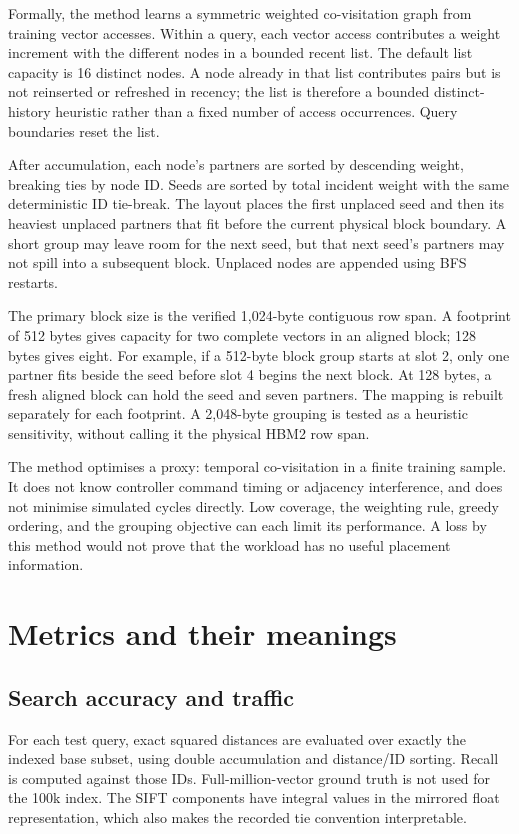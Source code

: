\documentclass[11pt,a4paper]{report}
\begin{document}
Formally, the method learns a symmetric weighted co-visitation graph from training vector accesses. Within a query, each vector access contributes a weight increment with the different nodes in a bounded recent list. The default list capacity is 16 distinct nodes. A node already in that list contributes pairs but is not reinserted or refreshed in recency; the list is therefore a bounded distinct-history heuristic rather than a fixed number of access occurrences. Query boundaries reset the list.

After accumulation, each node's partners are sorted by descending weight, breaking ties by node ID. Seeds are sorted by total incident weight with the same deterministic ID tie-break. The layout places the first unplaced seed and then its heaviest unplaced partners that fit before the current physical block boundary. A short group may leave room for the next seed, but that next seed's partners may not spill into a subsequent block. Unplaced nodes are appended using BFS restarts.

The primary block size is the verified 1,024-byte contiguous row span. A footprint of 512 bytes gives capacity for two complete vectors in an aligned block; 128 bytes gives eight. For example, if a 512-byte block group starts at slot 2, only one partner fits beside the seed before slot 4 begins the next block. At 128 bytes, a fresh aligned block can hold the seed and seven partners. The mapping is rebuilt separately for each footprint. A 2,048-byte grouping is tested as a heuristic sensitivity, without calling it the physical HBM2 row span.

The method optimises a proxy: temporal co-visitation in a finite training sample. It does not know controller command timing or adjacency interference, and does not minimise simulated cycles directly. Low coverage, the weighting rule, greedy ordering, and the grouping objective can each limit its performance. A loss by this method would not prove that the workload has no useful placement information.



\section{Metrics and their meanings}
\subsection{Search accuracy and traffic}
For each test query, exact squared distances are evaluated over exactly the indexed base subset, using double accumulation and distance/ID sorting. Recall is computed against those IDs. Full-million-vector ground truth is not used for the 100k index. The SIFT components have integral values in the mirrored float representation, which also makes the recorded tie convention interpretable.
\end{document}
